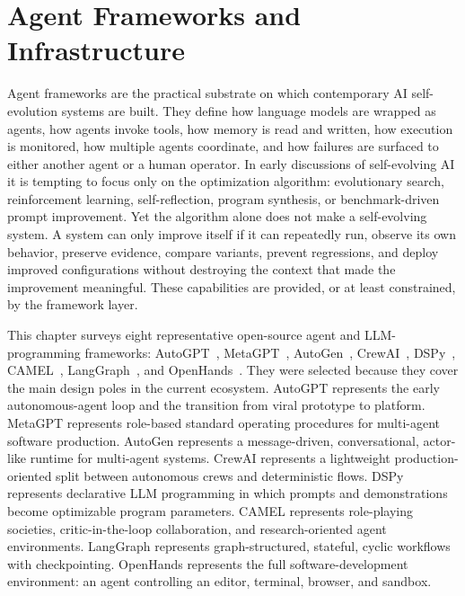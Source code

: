 \section{Agent Frameworks and Infrastructure}
\label{sec:agent-frameworks-infrastructure}

Agent frameworks are the practical substrate on which contemporary AI self-evolution systems are built.  They define how language models are wrapped as agents, how agents invoke tools, how memory is read and written, how execution is monitored, how multiple agents coordinate, and how failures are surfaced to either another agent or a human operator.  In early discussions of self-evolving AI it is tempting to focus only on the optimization algorithm: evolutionary search, reinforcement learning, self-reflection, program synthesis, or benchmark-driven prompt improvement.  Yet the algorithm alone does not make a self-evolving system.  A system can only improve itself if it can repeatedly run, observe its own behavior, preserve evidence, compare variants, prevent regressions, and deploy improved configurations without destroying the context that made the improvement meaningful.  These capabilities are provided, or at least constrained, by the framework layer.

This chapter surveys eight representative open-source agent and LLM-programming frameworks: AutoGPT~\cite{autogpt2023}, MetaGPT~\cite{metagpt2023}, AutoGen~\cite{autogen2023}, CrewAI~\cite{crewai2024}, DSPy~\cite{dspy2023}, CAMEL~\cite{camel2023}, LangGraph~\cite{langgraph2024}, and OpenHands~\cite{openhands2024}.  They were selected because they cover the main design poles in the current ecosystem.  AutoGPT represents the early autonomous-agent loop and the transition from viral prototype to platform.  MetaGPT represents role-based standard operating procedures for multi-agent software production.  AutoGen represents a message-driven, conversational, actor-like runtime for multi-agent systems.  CrewAI represents a lightweight production-oriented split between autonomous crews and deterministic flows.  DSPy represents declarative LLM programming in which prompts and demonstrations become optimizable program parameters.  CAMEL represents role-playing societies, critic-in-the-loop collaboration, and research-oriented agent environments.  LangGraph represents graph-structured, stateful, cyclic workflows with checkpointing.  OpenHands represents the full software-development environment: an agent controlling an editor, terminal, browser, and sandbox.

